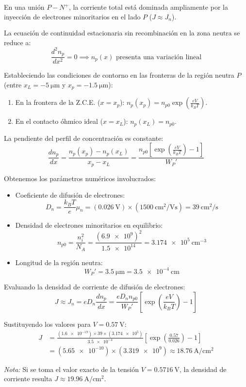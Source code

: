\begin{problema}
En una unión $P-N^+$, la corriente total está dominada ampliamente por la inyección de electrones minoritarios en el lado $P$ ($J \approx J_n$).

La ecuación de continuidad estacionaria sin recombinación en la zona neutra se reduce a:
\[
\frac{d^2 n_p}{dx^2} = 0 \implies n_p(x) \text{ presenta una variación lineal}
\]

Estableciendo las condiciones de contorno en las fronteras de la región neutra $P$ (entre $x_L = -\SI{5}{\um}$ y $x_p = -\SI{1.5}{\um}$):
\begin{enumerate}
    \item En la frontera de la Z.C.E. ($x = x_p$): $n_p(x_p) = n_{p0} \exp\left(\frac{e V}{k_B T}\right)$.
    \item En el contacto óhmico ideal ($x = x_L$): $n_p(x_L) = n_{p0}$.
\end{enumerate}

La pendiente del perfil de concentración es constante:
\[
\frac{dn_p}{dx} = \frac{n_p(x_p) - n_p(x_L)}{x_p - x_L} = \frac{n_{p0} \left[ \exp\left(\frac{e V}{k_B T}\right) - 1 \right]}{W_P'}
\]

Obtenemos los parámetros numéricos involucrados:
\begin{itemize}
    \item Coeficiente de difusión de electrones:
    \[
    D_n = \frac{k_B T}{e} \mu_n = (\SI{0.026}{\V}) \times (\SI{1500}{\cm^2/\V\second}) = \SI{39}{\cm^2/\second}
    \]    
    \item Densidad de electrones minoritarios en equilibrio:
    \[
    n_{p0} = \frac{n_i^2}{N_A} = \frac{(\num{6.9e9})^2}{\num{1.5e14}} = \SI{3.174e5}{\cm^{-3}}
    \]
    \item Longitud de la región neutra:
    \[
    W_P' = \SI{3.5}{\um} = \SI{3.5e-4}{\cm}
    \]
\end{itemize}

Evaluando la densidad de corriente de difusión de electrones:
\[
J \approx J_n = e D_n \frac{dn_p}{dx} = \frac{e D_n n_{p0}}{W_P'} \left[ \exp\left(\frac{e V}{k_B T}\right) - 1 \right]
\]

Sustituyendo los valores para $V = \SI{0.57}{\V}$:
\begin{align*}
    J & = \frac{(\num{1.6e-19}) \times 39 \times (\num{3.174e5})}{\num{3.5e-4}} \left[ \exp\left(\frac{0.57}{0.026}\right) - 1 \right] \\
    & = (\num{5.65e-10}) \times (\num{3.319e9}) \approx \SI{18.76}{\A\per\cm^2}
\end{align*}

\textit{Nota:} Si se toma el valor exacto de la tensión $V = \SI{0.5716}{\V}$, la densidad de corriente resulta $J \approx \SI{19.96}{\A\per\cm^2}$.
\end{problema}
